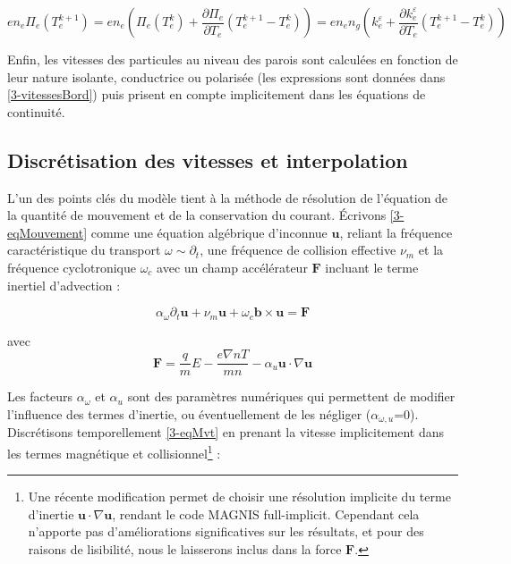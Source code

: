 \begin{refsection}
\begin{equation}
en_e\Pi_e(T_e^{k+1})=en_e\left(\Pi_e(T_e^{k})+\frac{\partial \Pi_e}{\partial
T_e}\left(T_e^{k+1}-T_e^{k}\right)\right)= en_en_g\left(k_e^\varepsilon+
\frac{\partial k_e^\varepsilon}{\partial T_e}(T_e^{k+1}-T_e^{k})\right)
\end{equation}


Enfin, les vitesses des particules au niveau des parois sont calculées en
fonction de leur nature isolante, conductrice ou polarisée (les expressions
sont données dans \ref{3-vitessesBord}) puis prisent en compte implicitement
dans les équations de continuité.

\subsection{Discrétisation des vitesses et interpolation}
L'un des points clés du modèle tient à la méthode de résolution de l'équation de
la quantité de mouvement et de la conservation du courant. Écrivons
\eqref{3-eqMouvement} comme une équation algébrique d'inconnue $\mathbf u$, reliant la fréquence caractéristique du transport
$\omega\sim\partial_t$, une fréquence de collision effective $\nu_m$ et la
fréquence cyclotronique $\omega_c$ avec un champ
accélérateur $\mathbf F$ incluant le terme inertiel d'advection :

\begin{equation}
\label{3-eqMvt}
\alpha_\omega\partial_t \mathbf{u} + 
\nu_m\mathbf{u}+\omega_{c}\mathbf{b}\times\mathbf{u}=
\mathbf F
\end{equation}

avec 
\begin{equation}\mathbf F=\frac{q}{m}E-\frac{e\nabla
n T}{m
n}-\alpha_u\mathbf{u}\cdot\nabla\mathbf{u}
\end{equation}

Les facteurs $\alpha_\omega$ et $\alpha_u$ sont des paramètres numériques qui
permettent de modifier l'influence des termes d'inertie, ou éventuellement de
les négliger ($\alpha_{\omega,u}$=0). Discrétisons temporellement
\eqref{3-eqMvt} en prenant la vitesse implicitement dans les termes
magnétique et collisionnel\footnote{Une récente modification permet de choisir
une résolution implicite du terme
d'inertie $\mathbf{u}\cdot\nabla\mathbf{u}$, rendant le code MAGNIS
full-implicit. Cependant cela n'apporte pas d'améliorations significatives sur
les résultats, et pour des raisons de lisibilité, nous le laisserons inclus dans
la force $\mathbf F$.} :


\end{refsection}
